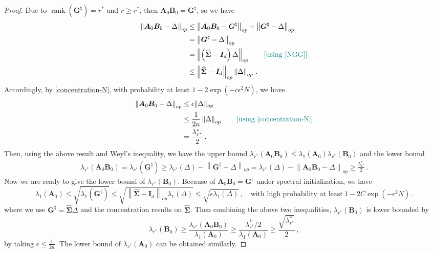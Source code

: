 \begin{proof}
    Due to $\operatorname{rank}\left({\bm G}^{\natural}\right) = r^*$ and $r\geq r^*$, then $\bm A_0 \bm B_0 = {\bm G}^{\natural}$, so we have
    \begin{align*}
        \left\|\bm A_0 \bm B_0 - \Delta\right\|_{op} & \leq \left\|\bm A_0 \bm B_0 - {\bm G}^{\natural}\right\|_{op} + \left\|{\bm G}^{\natural} - \Delta\right\|_{op}\\
        & = \left\|{\bm G}^{\natural} - \Delta\right\|_{op}\\
        & = \left\|\left(\widehat{\bm \Sigma} - \bm I_d\right) \Delta\right\|_{op} \tag*{\color{teal}[using \cref{NGG}]} \\
        & \leq \left\|\widehat{\bm \Sigma} - \bm I_d\right\|_{op} 
        \left\|\Delta\right\|_{op}\,.
    \end{align*}
    Accordingly, by \cref{concentration-N}, with probability at least $1-2\exp(- c \epsilon^2 N )$, we have
    \begin{align*}
        \left\|\bm A_0 \bm B_0 - \Delta\right\|_{op} & \leq \epsilon \| \Delta \|_{op} \\
        & \leq \frac{1}{2\kappa}\left\|\Delta\right\|_{op} \tag*{\color{teal}[using \cref{concentration-N}]} \\
        & = \frac{\lambda_{r^*}^*}{2}\,.
    \end{align*}
    Then, using the above result and Weyl's inequality, we have the upper bound $\lambda_{r^*}\left(\bm A_0 \bm B_0\right) \leq \lambda_{1}\left(\bm A_0\right)\lambda_{r^*}\left(\bm B_0\right)$ and the lower bound
    \begin{align*}
        \lambda_{r^*}\left(\bm A_0 \bm B_0\right) = \lambda_{r^*}\left(\bm G^{\natural} \right) \geq \lambda_{r^*}\left(\Delta\right) - \left\|{\bm G}^{\natural}-\Delta\right\|_{op} = \lambda_{r^*}\left(\Delta\right) - \left\|\bm A_0 \bm B_0 -\Delta\right\|_{op} \geq \frac{\lambda_{r^*}^*}{2}\,.
    \end{align*}
    Now we are ready to give the lower bound of $\lambda_{r^*}\left(\bm B_0\right)$. 
    Because of $\bm A_0 \bm B_0 = \bm G^{\natural}$ under spectral initialization, we have 
    \begin{equation*}
        \lambda_{1}\left(\bm A_0\right) \leq \sqrt{\lambda_1({\bm G}^{\natural})}\leq \sqrt{\left\|\widehat{\bm \Sigma} - \bm I_d\right\|_{op}\lambda_1(\Delta)}\leq \sqrt{\epsilon \lambda_1(\Delta)}\,, \quad \mbox{with high probability at least}~1- 2C\exp(- \epsilon^2 N)\,.
    \end{equation*}
    where we use $\bm G^{\natural} = \widehat{\bm \Sigma}\Delta$ and the concentration results on $\widehat{\bm \Sigma}$. Then combining the above two inequalities, $\lambda_{r^*}\left(\bm B_0\right)$ is lower bounded by
    \begin{equation*}
        \lambda_{r^*}\left(\bm B_0\right) \geq \frac{\lambda_{r^*}\left(\bm A_0 \bm B_0\right)}{\lambda_{1}\left(\bm A_0\right)} \geq \frac{\lambda_{r^*}^*/2}{\lambda_{1}\left(\bm A_0\right)}\geq \frac{\sqrt{\lambda_{r^*}^*}}{2}\,,
    \end{equation*}
by taking $\epsilon \leq \frac{1}{2 \kappa}$.
The lower bound of $\lambda_{r^*}\left(\bm A_0\right)$ can be obtained similarly.
\end{proof}
